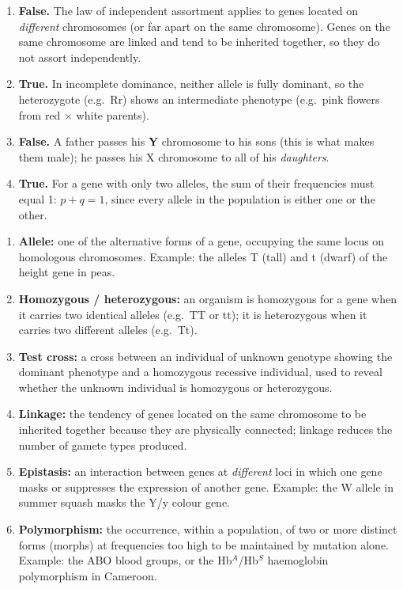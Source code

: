 \documentclass[11pt]{article}
\newcommand{\cle}[1]{{\popxbold\color{popdark}#1}}
\begin{document}
\begin{corrige}
\begin{enumerate}
\item \textbf{False.} The law of independent assortment applies to genes located on \emph{different} chromosomes (or far apart on the same chromosome). Genes on the same chromosome are \cle{linked} and tend to be inherited together, so they do not assort independently.
\item \textbf{True.} In \cle{incomplete dominance}, neither allele is fully dominant, so the heterozygote (e.g.\ Rr) shows an intermediate phenotype (e.g.\ pink flowers from red $\times$ white parents).
\item \textbf{False.} A father passes his \textbf{Y} chromosome to his sons (this is what makes them male); he passes his X chromosome to all of his \emph{daughters}.
\item \textbf{True.} For a gene with only two alleles, the sum of their frequencies must equal 1: $p + q = 1$, since every allele in the population is either one or the other.
\end{enumerate}
\end{corrige}

\begin{corrige}
\begin{enumerate}
\item \textbf{Allele:} one of the alternative forms of a gene, occupying the same locus on homologous chromosomes. Example: the alleles T (tall) and t (dwarf) of the height gene in peas.
\item \textbf{Homozygous / heterozygous:} an organism is \cle{homozygous} for a gene when it carries two identical alleles (e.g.\ TT or tt); it is \cle{heterozygous} when it carries two different alleles (e.g.\ Tt).
\item \textbf{Test cross:} a cross between an individual of unknown genotype showing the dominant phenotype and a homozygous recessive individual, used to reveal whether the unknown individual is homozygous or heterozygous.
\item \textbf{Linkage:} the tendency of genes located on the same chromosome to be inherited together because they are physically connected; linkage reduces the number of gamete types produced.
\item \textbf{Epistasis:} an interaction between genes at \emph{different} loci in which one gene masks or suppresses the expression of another gene. Example: the W allele in summer squash masks the Y/y colour gene.
\item \textbf{Polymorphism:} the occurrence, within a population, of two or more distinct forms (morphs) at frequencies too high to be maintained by mutation alone. Example: the ABO blood groups, or the Hb$^A$/Hb$^S$ haemoglobin polymorphism in Cameroon.
\end{enumerate}
\end{corrige}
\end{document}
